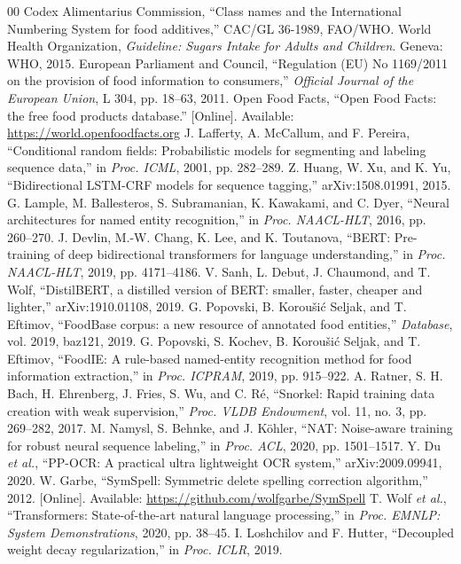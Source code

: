 \documentclass[conference]{IEEEtran}
\begin{document}
\begin{thebibliography}{00}
 Codex Alimentarius Commission, ``Class names and the International Numbering System for food additives,'' CAC/GL 36-1989, FAO/WHO.
 World Health Organization, \textit{Guideline: Sugars Intake for Adults and Children}. Geneva: WHO, 2015.
 European Parliament and Council, ``Regulation (EU) No 1169/2011 on the provision of food information to consumers,'' \textit{Official Journal of the European Union}, L 304, pp. 18--63, 2011.
 Open Food Facts, ``Open Food Facts: the free food products database.'' [Online]. Available: \url{https://world.openfoodfacts.org}
 J. Lafferty, A. McCallum, and F. Pereira, ``Conditional random fields: Probabilistic models for segmenting and labeling sequence data,'' in \textit{Proc. ICML}, 2001, pp. 282--289.
 Z. Huang, W. Xu, and K. Yu, ``Bidirectional LSTM-CRF models for sequence tagging,'' arXiv:1508.01991, 2015.
 G. Lample, M. Ballesteros, S. Subramanian, K. Kawakami, and C. Dyer, ``Neural architectures for named entity recognition,'' in \textit{Proc. NAACL-HLT}, 2016, pp. 260--270.
 J. Devlin, M.-W. Chang, K. Lee, and K. Toutanova, ``BERT: Pre-training of deep bidirectional transformers for language understanding,'' in \textit{Proc. NAACL-HLT}, 2019, pp. 4171--4186.
 V. Sanh, L. Debut, J. Chaumond, and T. Wolf, ``DistilBERT, a distilled version of BERT: smaller, faster, cheaper and lighter,'' arXiv:1910.01108, 2019.
 G. Popovski, B. Korou\v{s}i\'{c} Seljak, and T. Eftimov, ``FoodBase corpus: a new resource of annotated food entities,'' \textit{Database}, vol. 2019, baz121, 2019.
 G. Popovski, S. Kochev, B. Korou\v{s}i\'{c} Seljak, and T. Eftimov, ``FoodIE: A rule-based named-entity recognition method for food information extraction,'' in \textit{Proc. ICPRAM}, 2019, pp. 915--922.
 A. Ratner, S. H. Bach, H. Ehrenberg, J. Fries, S. Wu, and C. R\'{e}, ``Snorkel: Rapid training data creation with weak supervision,'' \textit{Proc. VLDB Endowment}, vol. 11, no. 3, pp. 269--282, 2017.
 M. Namysl, S. Behnke, and J. K\"{o}hler, ``NAT: Noise-aware training for robust neural sequence labeling,'' in \textit{Proc. ACL}, 2020, pp. 1501--1517.
 Y. Du \textit{et al.}, ``PP-OCR: A practical ultra lightweight OCR system,'' arXiv:2009.09941, 2020.
 W. Garbe, ``SymSpell: Symmetric delete spelling correction algorithm,'' 2012. [Online]. Available: \url{https://github.com/wolfgarbe/SymSpell}
 T. Wolf \textit{et al.}, ``Transformers: State-of-the-art natural language processing,'' in \textit{Proc. EMNLP: System Demonstrations}, 2020, pp. 38--45.
 I. Loshchilov and F. Hutter, ``Decoupled weight decay regularization,'' in \textit{Proc. ICLR}, 2019.
\end{thebibliography}
\end{document}
